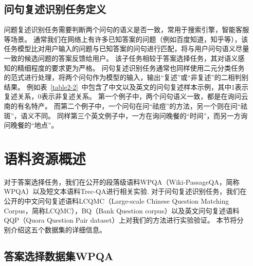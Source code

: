 

\subsection{问句复述识别任务定义}

问题复述识别任务需要判断两个问句的语义是否一致，常用于搜索引擎，智能客服等场景。
通常我们在网络上有许多已知答案的问题（例如百度知道，知乎等），该任务模型比对用户输入的问题与已知答案的问句进行匹配，将与用户问句语义尽量一致的候选问题的答案反馈给用户。
该子任务相较于答案选择任务，其对语义感知的精细程度的要求更为严格。
问句复述识别任务通常也同样使用二元分类任务的范式进行处理，将两个问句作为模型的输入，输出“复述”或“非复述”的二相判别结果。
例如表~\ref{table2-2}~中包含了中文以及英文的问句复述样本示例，其中1表示复述关系，0表示非复述关系。
第一个例子中，两个问句语义一致，都是在询问云南的有名特产。
而第二个例子中，一个问句在问“祛痘”的方法，另一个则在问“祛斑”，语义不同。
同样第三个英文例子中，一方在询问晚餐的“时间”，而另一方询问晚餐的“地点”。



\section{语料资源概述}
\label{2.2 语料资源概述}

对于答案选择任务，我们在公开的段落级语料WPQA（Wiki-PassageQA，简称WPQA）\cite{cohen2018wikipassageqa}以及短文本语料Trec-QA\cite{wang2007jeopardy}进行相关实验.
对于问句复述识别任务，我们在公开的中文问句复述语料LCQMC（Large-scale Chinese Question Matching Corpus，简称LCQMC）\cite{liu2018lcqmc}，BQ（Bank Question corpus）\cite{chen2018bq}以及英文问句复述语料QQP（Quora Question Pair dataset）\cite{shankar2017first}上对我们的方法进行实验验证。
本节将分别介绍这五个数据集的详细信息。


\subsection{答案选择数据集WPQA}

